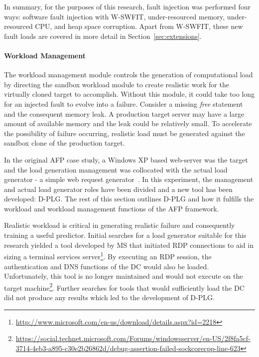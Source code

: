 \tabFaults %

\tabTranslationThirtyTwo
\tabTranslationSixtyFour

In summary, for the purposes of this research, fault injection was performed
four ways: software fault injection with \ac{W-SWFIT}, under-resourced memory,
under-resourced CPU, and heap space corruption.  Apart from \ac{W-SWFIT}, these
new fault loads are covered in more detail in Section~\ref{sec:extensions}.

\paragraph{Workload Management} \label{sec:workloadMgr} 
The workload management module controls the generation of computational load by
directing the sandbox workload module to create realistic work for the
virtually cloned target to accomplish.  Without this module, it could take too
long for an injected fault to evolve into a failure.  Consider a missing
\emph{free} statement and the consequent memory leak.  A production target
server may have a large amount of available memory and the leak could be
relatively small.  To accelerate the possibility of failure occurring,
realistic load must be generated against the sandbox clone of the production
target.

In the original \ac{AFP} case study, a Windows XP based web-server was the
target and the load generation management was collocated with the actual load
generator - a simple web request generator~\cite{irrera2015}.  In this
experiment, the management and actual load generator roles have been divided
and a new tool has been developed: \ac{D-PLG}.  The rest of this section
outlines \ac{D-PLG} and how it fulfills the workload and workload management
functions of the \ac{AFP} framework.

Realistic workload is critical in generating realistic failure and consequently
training a useful predictor.  Initial searches for a load generator suitable
for this research yielded a tool developed by \ac{MS} that initiated \ac{RDP}
connections to aid in sizing a terminal services
server\footnote{\url{http://www.microsoft.com/en-us/download/details.aspx?id=2218}}.
By executing an \ac{RDP} session, the authentication and \ac{DNS} functions of
the \ac{DC} would also be loaded.  Unfortunately, this tool is no longer
maintained and would not execute on the target
machine\footnote{\url{https://social.technet.microsoft.com/Forums/windowsserver/en-US/2f8fa5cf-3714-4eb3-a895-c30e2b26862d/debug-assertion-failed-sockcorecpp-line-623}}.
Further searches for tools that would sufficiently load the \ac{DC} did not
produce any results which led to the development of \ac{D-PLG}.

